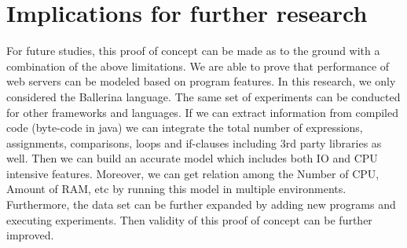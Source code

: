 \section{Implications for further research}

For future studies, this proof of concept can be made as to the ground with a combination of the above limitations. We are able to prove that performance of web servers can be modeled based on program features. In this research, we only considered the Ballerina language. The same set of experiments can be conducted for other frameworks and languages. If we can extract information from compiled code (byte-code in java) we can integrate the total number of expressions, assignments, comparisons, loops and if-clauses including 3rd party libraries as well. Then we can build an accurate model which includes both IO and CPU intensive features. Moreover, we can get relation among the Number of CPU, Amount of RAM, etc by running this model in multiple environments. Furthermore, the data set can be further expanded by adding new programs and executing experiments. Then validity of this proof of concept can be further improved.